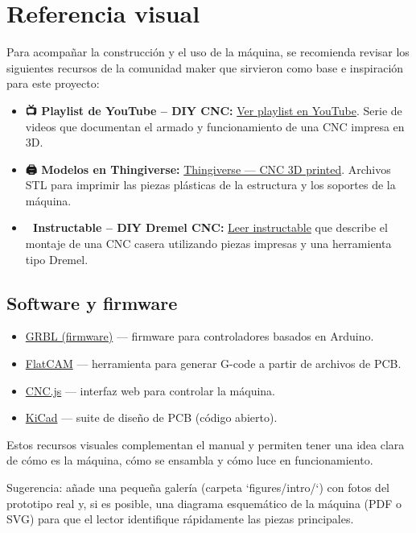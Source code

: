 \section*{Referencia visual}
Para acompañar la construcción y el uso de la máquina, se recomienda revisar los siguientes recursos de la comunidad maker que sirvieron como base e inspiración para este proyecto:
\begin{itemize}
	\item \textbf{📺 Playlist de YouTube – DIY CNC:} \href{https://www.youtube.com/playlist?list=PLktKi_COpyPRVn0faQq_ZoM37WAOP8pfA}{Ver playlist en YouTube}. Serie de videos que documentan el armado y funcionamiento de una CNC impresa en 3D.
	\item \textbf{🖨️ Modelos en Thingiverse:} \href{https://www.thingiverse.com/thing:3004773}{Thingiverse — CNC 3D printed}. Archivos STL para imprimir las piezas plásticas de la estructura y los soportes de la máquina.
	\item \textbf{📑 Instructable – DIY Dremel CNC:} \href{https://www.instructables.com/DIY-3D-Printed-Dremel-CNC/}{Leer instructable} que describe el montaje de una CNC casera utilizando piezas impresas y una herramienta tipo Dremel.
\end{itemize}

\subsection*{Software y firmware}
\begin{itemize}
	\item \href{https://github.com/grbl/grbl}{GRBL (firmware)} — firmware para controladores basados en Arduino.
	\item \href{http://flatcam.org/}{FlatCAM} — herramienta para generar G-code a partir de archivos de PCB.
	\item \href{https://cnc.js.org/}{CNC.js} — interfaz web para controlar la máquina.
	\item \href{https://www.kicad.org/}{KiCad} — suite de diseño de PCB (código abierto).
\end{itemize}

Estos recursos visuales complementan el manual y permiten tener una idea clara de cómo es la máquina, cómo se ensambla y cómo luce en funcionamiento.

\begin{notebox}
Sugerencia: añade una pequeña galería (carpeta `figures/intro/`) con fotos del prototipo real y, si es posible, una diagrama esquemático de la máquina (PDF o SVG) para que el lector identifique rápidamente las piezas principales.
\end{notebox}

